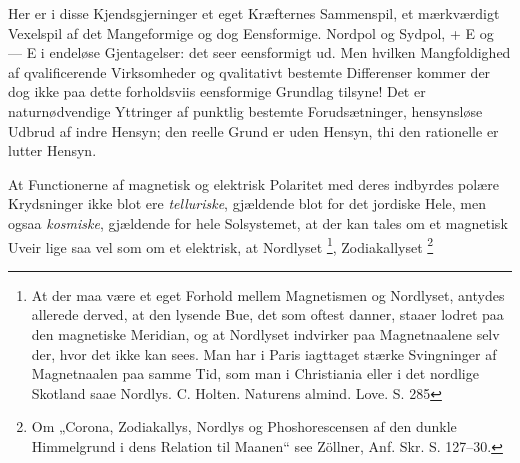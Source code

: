 \documentclass[12pt,a4paper]{book}
\renewcommand{\thefootnote}{*)}
\begin{document}
Her er i disse Kjendsgjerninger et eget Kræfternes Sammenspil, et
mærkværdigt Vexelspil af det Mangeformige og dog Eensformige. Nordpol
og Sydpol, + E og --- E i endeløse Gjentagelser: det seer eensformigt
ud. Men hvilken Mangfoldighed af qvalificerende Virksomheder og
qvalitativt bestemte Differenser kommer der dog ikke paa dette
forholdsviis eensformige Grundlag tilsyne! Det er naturnødvendige
Yttringer af punktlig bestemte Forudsætninger, hensynsløse Udbrud af
indre Hensyn; den reelle Grund er uden Hensyn, thi den rationelle er
lutter Hensyn.

At Functionerne af magnetisk og elektrisk Polaritet med deres
indbyrdes polære Krydsninger ikke blot ere \emph{telluriske},
gjældende blot for det jordiske Hele, men
ogsaa \emph{kosmiske}, gjældende for hele Solsystemet, at der kan
tales om et magnetisk Uveir lige saa vel som om et elektrisk, at
Nordlyset%
\footnote{%
At der maa være et eget Forhold mellem Magnetismen og Nordlyset,
antydes allerede derved, at den lysende Bue, det som oftest danner,
staaer lodret paa den magnetiske Meridian, og at Nordlyset indvirker
paa Magnetnaalene selv der, hvor det ikke kan sees. Man har i Paris
iagttaget stærke Svingninger af Magnetnaalen paa samme Tid, som man i
Christiania eller i det nordlige Skotland saae Nordlys. C. Holten.
Naturens almind. Love. S. 285}, Zodiakallyset%
\renewcommand{\thefootnote}{**)}%
\footnote{%
Om „Corona, Zodiakallys, Nordlys og Phoshorescensen af den dunkle
Himmelgrund i dens Relation til Maanen“ see Zöllner, Anf. Skr.
S. 127--30.}%
\end{document}
